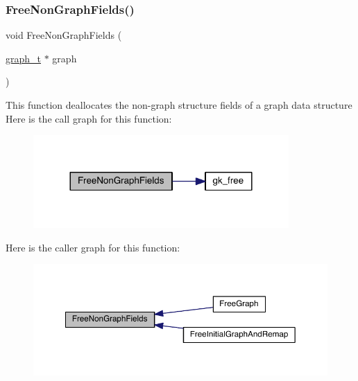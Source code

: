 \subsubsection{\texorpdfstring{Free\+Non\+Graph\+Fields()}{FreeNonGraphFields()}}
{\footnotesize\ttfamily void Free\+Non\+Graph\+Fields (\begin{DoxyParamCaption}\item[{\hyperlink{a00734}{graph\+\_\+t} $\ast$}]{graph }\end{DoxyParamCaption})}

This function deallocates the non-\/graph structure fields of a graph data structure Here is the call graph for this function\+:\nopagebreak
\begin{figure}[H]
\begin{center}
\leavevmode
\includegraphics[width=276pt]{a00852_a0ff13bda23f95ec19bb263ef036cd109_cgraph}
\end{center}
\end{figure}
Here is the caller graph for this function\+:\nopagebreak
\begin{figure}[H]
\begin{center}
\leavevmode
\includegraphics[width=350pt]{a00852_a0ff13bda23f95ec19bb263ef036cd109_icgraph}
\end{center}
\end{figure}
\mbox{\label{a00852_a7f1865a64a8a13def4eacf3d253f970a}} 
